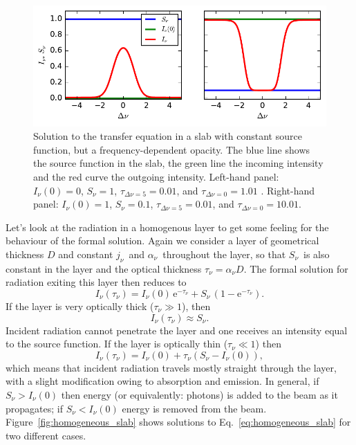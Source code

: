 \documentclass[12pt]{article}
\numberwithin{equation}{section}
\def\exp{\mathrm{e}}
\def\Inu{\ensuremath{I_{\nu}}}
\def\jnu{\ensuremath{j_{\nu}}}
\def\Snu{\ensuremath{S_{\nu}}}
\def\anu{\ensuremath{\alpha_{\nu}}}
\def\taunu{\ensuremath{\tau_{\nu}}}
\newcommand{\be}{\begin{equation}}
\newcommand{\ee}{\end{equation}}
\begin{document}
\begin{figure}
  \centering
 \includegraphics[width=14cm]{figs/homogeneous_slab_spectrum}
  \caption{Solution to the transfer equation in a slab with constant source function, but a frequency-dependent opacity. The blue line shows the source function in the slab, the green line the incoming intensity and the red curve the outgoing intensity. Left-hand panel: $ \Inu(0) = 0$, $\Snu = 1$, $\tau_{\Delta \nu=5} = 0.01$, and $\tau_{\Delta \nu=0} = 1.01$ . Right-hand panel: $ \Inu(0) = 1$, $\Snu = 0.1$, $\tau_{\Delta \nu=5} = 0.01$, and $\tau_{\Delta \nu=0} = 10.01$. \label{fig:homogeneous_slab_freq}}
\end{figure}


Let's look at the radiation in a homogenous layer to get some feeling for the behaviour of the formal solution. Again we consider a layer of geometrical thickness $D$ and constant \jnu\ and \anu\ throughout the layer, so that \Snu\ is also constant in the layer and the optical thickness $\taunu = \anu D$. The formal solution for radiation exiting this layer then reduces to
\be
\Inu(\taunu)  = \Inu(0) \, \exp^{-\taunu}  +  \Snu \, (1-\exp^{-\taunu}). \label{eq:homogeneous_slab}
\ee 
If the layer is very optically thick ($\taunu \gg 1$), then 
\be
\Inu(\taunu) \approx  \Snu.
\ee 
Incident radiation cannot penetrate the layer and one receives an intensity equal to the source function.
If the layer is optically thin ($\taunu \ll 1$) then
\be
\Inu(\taunu)  = \Inu(0) +  \taunu \left(  \Snu -\Inu(0) \right), \label{eq:linapprox}
\ee
which means that incident radiation travels mostly straight through the layer, with a slight modification owing to absorption and emission. In general, if $\Snu > \Inu(0)$ then energy (or equivalently: photons) is added to the beam as it propagates; if $\Snu < \Inu(0)$ energy is removed from the beam. Figure~\ref{fig:homogeneous_slab} shows solutions to Eq.~\ref{eq:homogeneous_slab} for two different cases.
\end{document}
